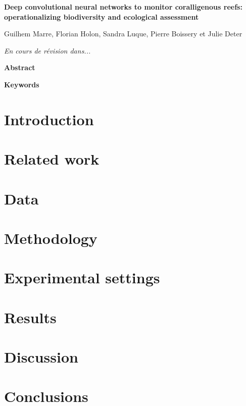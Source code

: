 \clearpage

\noindent\textbf{Deep convolutional neural networks to monitor coralligenous reefs: operationalizing biodiversity and ecological assessment}

\noindent Guilhem Marre, Florian Holon, Sandra Luque, Pierre Boissery et Julie Deter

\noindent\textit{En cours de révision dans...}

\noindent\textbf{Abstract}


\noindent\textbf{Keywords}

\section{Introduction}\label{chapitre1_1}

\section{Related work}\label{chapitre1_2}

\section{Data}\label{chapitre1_3}

\section{Methodology}\label{chapitre1_4}

\section{Experimental settings}\label{chapitre1_5}

\section{Results}\label{chapitre1_6}

\section{Discussion}\label{chapitre1_7}

\section{Conclusions}\label{chapitre1_8}

\newpage